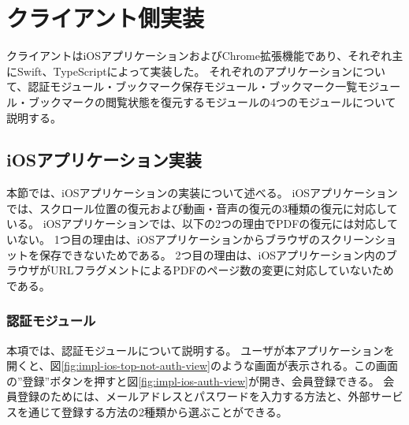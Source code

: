 

\section{クライアント側実装}
クライアントはiOSアプリケーションおよびChrome拡張機能であり、それぞれ主にSwift、TypeScriptによって実装した。
それぞれのアプリケーションについて、認証モジュール・ブックマーク保存モジュール・ブックマーク一覧モジュール・ブックマークの閲覧状態を復元するモジュールの4つのモジュールについて説明する。

\subsection{iOSアプリケーション実装}
本節では、iOSアプリケーションの実装について述べる。
iOSアプリケーションでは、スクロール位置の復元および動画・音声の復元の3種類の復元に対応している。
iOSアプリケーションでは、以下の2つの理由でPDFの復元には対応していない。
1つ目の理由は、iOSアプリケーションからブラウザのスクリーンショットを保存できないためである。
2つ目の理由は、iOSアプリケーション内のブラウザがURLフラグメントによるPDFのページ数の変更に対応していないためである。

\subsubsection{認証モジュール}
本項では、認証モジュールについて説明する。
ユーザが本アプリケーションを開くと、図\ref{fig:impl-ios-top-not-auth-view}のような画面が表示される。この画面の”登録”ボタンを押すと図\ref{fig:impl-ios-auth-view}が開き、会員登録できる。
会員登録のためには、メールアドレスとパスワードを入力する方法と、外部サービスを通じて登録する方法の2種類から選ぶことができる。

